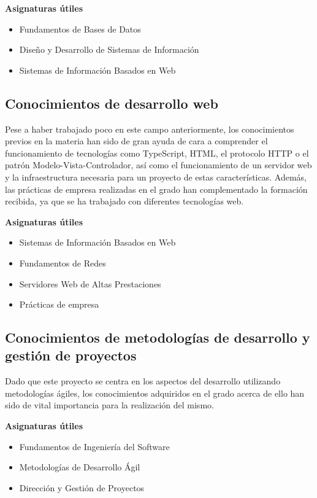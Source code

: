 \documentclass[10pt, a4paper]{aqademic}
\begin{document}
\textbf{Asignaturas útiles} 

\begin{itemize}
	\item Fundamentos de Bases de Datos
	\item Diseño y Desarrollo de Sistemas de Información
	\item Sistemas de Información Basados en Web
\end{itemize}


\subsection*{Conocimientos de desarrollo web}

Pese a haber trabajado poco en este campo anteriormente, los conocimientos previos en la materia han sido de gran ayuda de cara a comprender el funcionamiento de tecnologías como TypeScript, HTML, el protocolo HTTP o el patrón Modelo-Vista-Controlador, así como el funcionamiento de un servidor web y la infraestructura necesaria para un proyecto de estas características. Además, las prácticas de empresa realizadas en el grado han complementado la formación recibida, ya que se ha trabajado con diferentes tecnologías web.

\textbf{Asignaturas útiles}

\begin{itemize}
	\item Sistemas de Información Basados en Web
	\item Fundamentos de Redes
	\item Servidores Web de Altas Prestaciones
	\item Prácticas de empresa
\end{itemize}


\subsection*{Conocimientos de metodologías de desarrollo y gestión de proyectos}

Dado que este proyecto se centra en los aspectos del desarrollo utilizando metodologías ágiles, los conocimientos adquiridos en el grado acerca de ello han sido de vital importancia para la realización del mismo.

\textbf{Asignaturas útiles}

\begin{itemize}
	\item Fundamentos de Ingeniería del Software
	\item Metodologías de Desarrollo Ágil
	\item Dirección y Gestión de Proyectos
\end{itemize}
\end{document}
